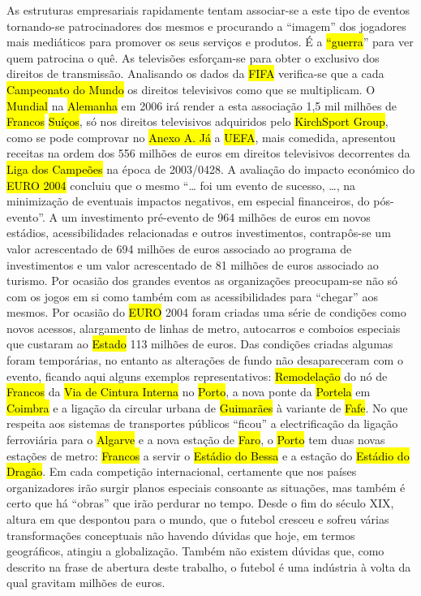 \documentclass[a4paper,12pt]{article}
\begin{document}
 As estruturas empresariais rapidamente tentam associar-se a este tipo de eventos tornando-se patrocinadores dos mesmos e procurando a “imagem” dos jogadores mais mediáticos para promover os seus serviços e produtos. É a \hl{“guerra}” para ver quem patrocina o quê.
 As televisões esforçam-se para obter o exclusivo dos direitos de transmissão. Analisando os dados da \hl{FIFA} verifica-se que a cada \hl{Campeonato do Mundo} os direitos televisivos como que se multiplicam. O \hl{Mundial} na \hl{Alemanha} em 2006 irá render a esta associação 1,5 mil milhões de \hl{Francos} \hl{Suíços}, só nos direitos televisivos adquiridos pelo \hl{KirchSport Group}, como se pode comprovar no \hl{Anexo A. Já} a \hl{UEFA}, mais comedida, apresentou receitas na ordem dos 556 milhões de euros em direitos televisivos decorrentes da \hl{Liga dos Campeões} na época de 2003/0428.
 A avaliação do impacto económico do \hl{EURO 2004} concluiu que o mesmo “… foi um evento de sucesso, …, na minimização de eventuais impactos negativos, em especial financeiros, do pós-evento”. A um investimento pré-evento de 964 milhões de euros em novos estádios, acessibilidades relacionadas e outros investimentos, contrapôs-se um valor acrescentado de 694 milhões de euros associado ao programa de investimentos e um valor acrescentado de 81 milhões de euros associado ao turismo.
 Por ocasião dos grandes eventos as organizações preocupam-se não só com os jogos em si como também com as acessibilidades para “chegar” aos mesmos. Por ocasião do \hl{EURO}
2004 foram criadas uma série de condições como novos acessos, alargamento de linhas de metro, autocarros e comboios especiais que custaram ao \hl{Estado} 113 milhões de euros.
 Das condições criadas algumas foram temporárias, no entanto as alterações de fundo não desapareceram com o evento, ficando aqui alguns exemplos representativos:
\hl{Remodelação} do nó de \hl{Francos} da \hl{Via de Cintura Interna} no \hl{Porto}, a nova ponte da
 \hl{Portela} em \hl{Coimbra} e a ligação da circular urbana de \hl{Guimarães} à variante de \hl{Fafe}. No que respeita aos sistemas de transportes públicos “ficou” a electrificação da ligação ferroviária para o \hl{Algarve} e a nova estação de \hl{Faro}, o \hl{Porto} tem duas novas estações de metro: \hl{Francos} a servir o \hl{Estádio do Bessa} e a estação do \hl{Estádio do Dragão}.
 Em cada competição internacional, certamente que nos países organizadores irão surgir planos especiais consoante as situações, mas também é certo que há “obras” que irão perdurar no tempo.
Desde o fim do século XIX, altura em que despontou para o mundo, que o futebol cresceu e sofreu várias transformações conceptuais não havendo dúvidas que hoje, em termos geográficos, atingiu a globalização. Também não existem dúvidas que, como descrito na frase de abertura deste trabalho, o futebol é uma indústria à volta da qual gravitam milhões de euros.
\end{document}
